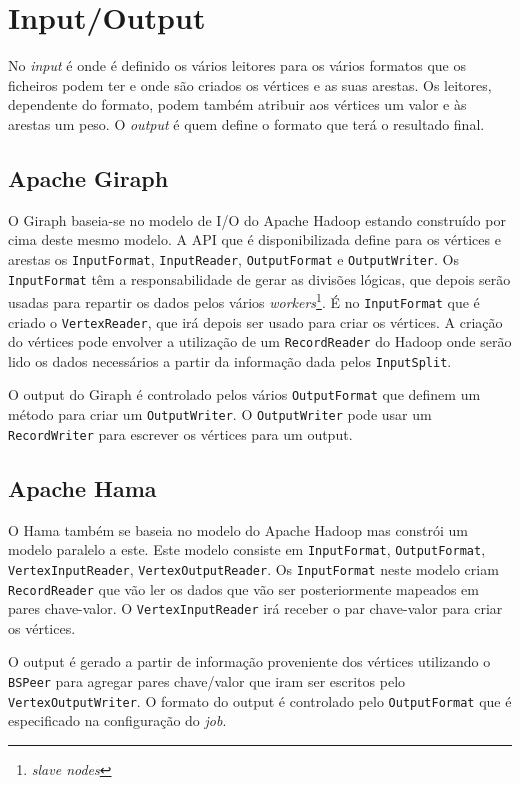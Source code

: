 \newpage
\section*{Input/Output}
No \textit{input} é onde é definido os vários leitores para os vários formatos que os ficheiros podem ter e onde são criados os vértices e as suas arestas. Os leitores, dependente do formato, podem também atribuir aos vértices um valor e às arestas um peso.
O \textit{output} é quem define	 o formato que terá o resultado final.
\subsection*{Apache Giraph}
O Giraph baseia-se no modelo de I/O do Apache Hadoop estando construído por cima deste mesmo modelo.
A API que é disponibilizada define para os vértices e arestas os \texttt{InputFormat}, \texttt{InputReader}, \texttt{OutputFormat} e \texttt{OutputWriter}.
Os \texttt{InputFormat} têm a responsabilidade de gerar as divisões lógicas, que depois serão usadas para repartir os dados pelos vários
\textit{workers}\footnote{\textit{slave nodes}}. É no \texttt{InputFormat} que é criado o \texttt{VertexReader}, que irá depois ser usado para criar os vértices.
A criação do vértices pode envolver a utilização de um \texttt{RecordReader} do Hadoop onde serão lido os dados necessários a partir da informação dada pelos \texttt{InputSplit}.

O output do Giraph é controlado pelos vários \texttt{OutputFormat} que definem um método para criar um \texttt{OutputWriter}. O \texttt{OutputWriter} pode usar um \texttt{RecordWriter}
para escrever os vértices para um output.

\subsection*{Apache Hama}

O Hama também se baseia no modelo do Apache Hadoop mas constrói um modelo paralelo a este.
Este modelo consiste em \texttt{InputFormat}, \texttt{OutputFormat}, \texttt{VertexInputReader}, \texttt{VertexOutputReader}. Os \texttt{InputFormat} neste modelo criam \texttt{RecordReader} 
que vão ler os dados que vão ser posteriormente mapeados em pares chave-valor. O \texttt{VertexInputReader} irá receber o par chave-valor para criar os
vértices.

O output é gerado a partir de informação proveniente dos vértices utilizando o \texttt{BSPeer} para agregar pares chave/valor que iram
ser escritos pelo \texttt{VertexOutputWriter}. O formato do output é controlado pelo \texttt{OutputFormat} que é especificado na
configuração do \textit{job}.

